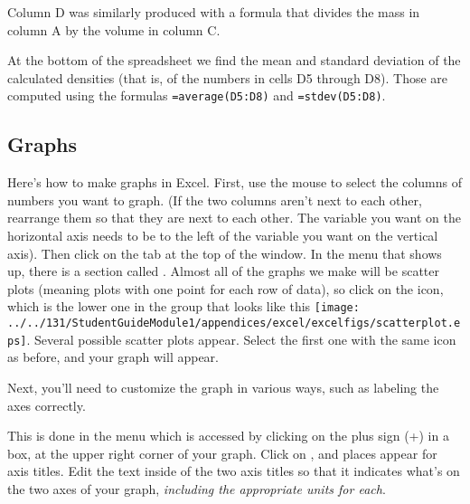 Column D was similarly produced with a formula that divides the
mass in column A by the volume in column C.

At the bottom of the spreadsheet we find the mean and standard
deviation of the calculated densities (that is, of the numbers
in cells D5 through D8).  Those are computed
using the formulas \verb!=average(D5:D8)! and \verb!=stdev(D5:D8)!.




\subsection{Graphs}

Here's how to make graphs in Excel.  First, use the mouse
to select the columns of numbers you want to graph.  (If the two
columns aren't next to each other, rearrange them so that they are next to 
each other. The variable you want on the horizontal axis needs to be to the 
left of the variable you want on the vertical axis).
Then click on the  tab at the top of the window.
In the menu that shows up, there is a section called .
Almost all of the graphs we make will be scatter plots (meaning plots
with one point for each row of data), so click on the  icon, 
which is the lower one in the group that looks like this  
\texttt{[image: ../../131/StudentGuideModule1/appendices/excel/excelfigs/scatterplot.eps]}.  
Several possible scatter plots appear. Select the 
first one with the same icon as before, and your graph will appear.
\vspace{0.5cm}

Next, you'll need to customize the graph in various ways, such
as labeling the axes correctly.  
\vspace{0.5cm}

This is done in the  menu which is accessed by clicking 
on the plus sign (+) in a box, at the upper right corner of your graph. Click 
on , and places appear for axis titles. Edit the text inside 
of the two axis titles so that it indicates what's on the two axes of your 
graph, \textit{including the appropriate units for each}.
\vspace{0.5cm}

